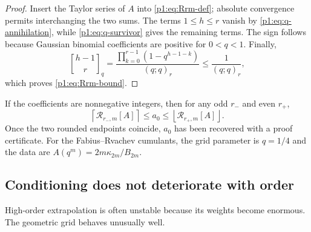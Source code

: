 \documentclass[11pt,oneside]{article}
\numberwithin{equation}{section}
\theoremstyle{definition}
\theoremstyle{remark}
\newcommand{\qbinom}[3]{\genfrac{[}{]}{0pt}{}{#1}{#2}_{#3}}
\begin{document}
\begin{proof}
Insert the Taylor series of $A$ into \eqref{p1:eq:Rrm-def}; absolute convergence permits
interchanging the two sums.  The terms $1\le h\le r$ vanish by
\eqref{p1:eq:q-annihilation}, while \eqref{p1:eq:q-survivor} gives the remaining terms.
The sign follows because Gaussian binomial coefficients are positive for $0<q<1$.
Finally,
\[
 \qbinom{h-1}{r}{q}
 =\frac{\prod_{k=0}^{r-1}(1-q^{h-1-k})}{(q;q)_r}
 \le\frac1{(q;q)_r},
\]
which proves \eqref{p1:eq:Rrm-bound}.
\end{proof}

\begin{corollary}
\label{p1:cor:integer-brackets}
If the coefficients are nonnegative integers, then for any odd $r_-$ and even $r_+$,
\begin{equation}
 \left\lceil\mathcal R_{r_-,m}[A]\right\rceil
 \le a_0\le
 \left\lfloor\mathcal R_{r_+,m}[A]\right\rfloor.
 \label{p1:eq:integer-brackets}
\end{equation}
Once the two rounded endpoints coincide, $a_0$ has been recovered with a proof certificate.
For the Fabius--Rvachev cumulants, the grid parameter is $q=1/4$ and the data are
$A(q^m)=2m\kappa_{2m}/B_{2m}$.
\end{corollary}

\subsection{Conditioning does not deteriorate with order}

High-order extrapolation is often unstable because its weights become enormous.  The
geometric grid behaves unusually well.
\end{document}
